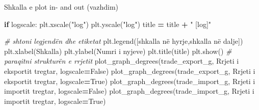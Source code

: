 \documentclass[
  ignorenonframetext,
]{beamer}
\newenvironment{Shaded}{\begin{snugshade}}{\end{snugshade}}
\newcommand{\CommentTok}[1]{\textcolor[rgb]{0.56,0.35,0.01}{\textit{#1}}}
\newcommand{\ControlFlowTok}[1]{\textcolor[rgb]{0.13,0.29,0.53}{\textbf{#1}}}
\newcommand{\NormalTok}[1]{#1}
\newcommand{\OperatorTok}[1]{\textcolor[rgb]{0.81,0.36,0.00}{\textbf{#1}}}
\newcommand{\StringTok}[1]{\textcolor[rgb]{0.31,0.60,0.02}{#1}}
\newcommand{\VariableTok}[1]{\textcolor[rgb]{0.00,0.00,0.00}{#1}}
\begin{document}
\begin{frame}[fragile]{Shkalla e plot in- and out (vazhdim)}
\protect\hypertarget{shkalla-e-plot-in--and-out-vazhdim}{}

\begin{Shaded}
\begin{Highlighting}[]
    \ControlFlowTok{if}\NormalTok{ logscale:}
\NormalTok{        plt.xscale(}\StringTok{"log"}\NormalTok{)}
\NormalTok{        plt.yscale(}\StringTok{"log"}\NormalTok{)}
\NormalTok{        title }\OperatorTok{=}\NormalTok{ title }\OperatorTok{+} \StringTok{" [log]"}

    \CommentTok{\# shtoni legjendën dhe etiketat}
\NormalTok{    plt.legend([}\StringTok{\textquotesingle{}shkalla në hyrje\textquotesingle{}}\NormalTok{,}\StringTok{\textquotesingle{}shkalla në dalje\textquotesingle{}}\NormalTok{])}
\NormalTok{    plt.xlabel(}\StringTok{\textquotesingle{}Shkalla\textquotesingle{}}\NormalTok{)}
\NormalTok{    plt.ylabel(}\StringTok{\textquotesingle{}Numri i nyjeve\textquotesingle{}}\NormalTok{)}
\NormalTok{    plt.title(title)}
\NormalTok{    plt.show()}
\CommentTok{\# paraqitni strukturën e rrjetit}
\NormalTok{plot\_graph\_degrees(trade\_export\_g, }\StringTok{\textquotesingle{}Rrjeti i eksportit tregtar\textquotesingle{}}\NormalTok{, logscale}\OperatorTok{=}\VariableTok{False}\NormalTok{)}
\NormalTok{plot\_graph\_degrees(trade\_export\_g, }\StringTok{\textquotesingle{}Rrjeti i eksportit tregtar\textquotesingle{}}\NormalTok{, logscale}\OperatorTok{=}\VariableTok{True}\NormalTok{)}
\NormalTok{plot\_graph\_degrees(trade\_import\_g, }\StringTok{\textquotesingle{}Rrjeti i importit tregtar\textquotesingle{}}\NormalTok{, logscale}\OperatorTok{=}\VariableTok{False}\NormalTok{)}
\NormalTok{plot\_graph\_degrees(trade\_import\_g, }\StringTok{\textquotesingle{}Rrjeti i importit tregtar\textquotesingle{}}\NormalTok{, logscale}\OperatorTok{=}\VariableTok{True}\NormalTok{)}
\end{Highlighting}
\end{Shaded}
\end{frame}
\end{document}
